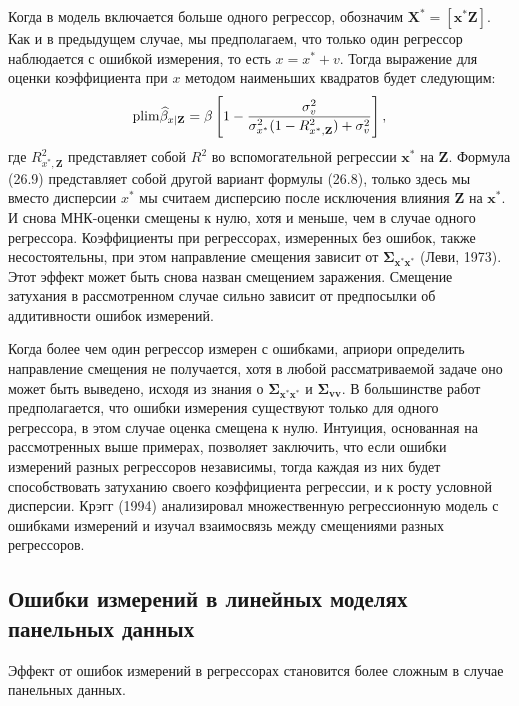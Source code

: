 Когда в модель включается больше одного регрессор, обозначим $\mathbf{X^*}=[\mathbf{x^* Z}]$. Как и в предыдущем случае, мы предполагаем, что только один регрессор наблюдается с ошибкой измерения, то есть $x=x^*+v$. Тогда выражение для оценки коэффициента при $x$ методом наименьших квадратов будет следующим:
\begin{equation}
\mathrm{plim }\widehat{\beta}_{x|\mathbf{Z}}=\beta \left[ 1-\frac{\sigma^2_v}{\sigma^2_{x^*}(1-R^2_{x^*,\mathbf{Z}})+\sigma^2_v}\right],
\end{equation}
где $R^2_{x^*,\mathbf{Z}}$ представляет собой $R^2$ во вспомогательной регрессии $\mathbf{x^*}$ на $\mathbf{Z}$. Формула (26.9) представляет собой другой вариант формулы (26.8), только здесь мы вместо дисперсии $x^*$ мы считаем дисперсию после исключения влияния $\mathbf{Z}$ на $\mathbf{x^*}$. И снова  МНК-оценки смещены к нулю, хотя и меньше, чем в случае одного регрессора. Коэффициенты при регрессорах, измеренных без ошибок, также несостоятельны, при этом направление смещения зависит от $\mathbf{\Sigma_{x^*x^*}}$ (Леви, 1973). Этот эффект может быть снова назван смещением заражения. Смещение затухания в рассмотренном случае сильно зависит от предпосылки об аддитивности ошибок измерений. 

Когда более чем один регрессор измерен с ошибками, априори определить направление смещения не получается, хотя в любой рассматриваемой задаче оно может быть выведено, исходя из знания о $\mathbf{\Sigma_{x^*x^*}}$ и $\mathbf{\Sigma_{vv}}$. В большинстве работ предполагается, что ошибки измерения существуют только для одного регрессора, в этом случае оценка смещена к нулю. Интуиция, основанная на рассмотренных выше примерах, позволяет заключить, что если ошибки измерений разных регрессоров независимы, тогда каждая из них будет способствовать затуханию своего коэффициента регрессии, и к росту условной дисперсии. Крэгг (1994) анализировал множественную регрессионную модель с ошибками измерений и изучал взаимосвязь между смещениями разных регрессоров.

\subsection{Ошибки измерений в линейных моделях панельных данных}
 
Эффект от ошибок измерений в регрессорах становится более сложным в случае панельных данных.

